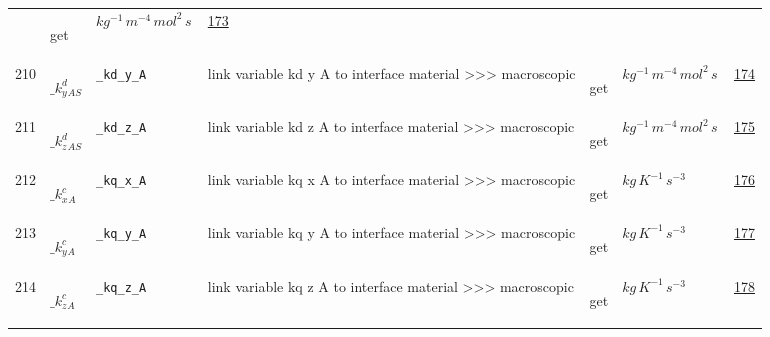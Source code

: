 \begin{longtable}{|p{1cm}|p{2.5cm}|p{4.5cm}|p{8cm}|p{3.0cm}|p{3cm}|p{1cm}|}
             & \begin{lay}get \end{lay}
             & $ kg^{-1} \,m^{-4} \,mol^{2} \,s \, $
             &                 \hyperlink{"e:173"}{ 173 }
                 \\
            210
             & \hypertarget{"v:210"}{ $ {{\_k^d_y}}{_{{A S}}} $}
             & \verb|_kd_y_A|
             & link variable kd y A to interface material >>> macroscopic
             & \begin{lay}get \end{lay}
             & $ kg^{-1} \,m^{-4} \,mol^{2} \,s \, $
             &                 \hyperlink{"e:174"}{ 174 }
                 \\
            211
             & \hypertarget{"v:211"}{ $ {{\_k^d_z}}{_{{A S}}} $}
             & \verb|_kd_z_A|
             & link variable kd z A to interface material >>> macroscopic
             & \begin{lay}get \end{lay}
             & $ kg^{-1} \,m^{-4} \,mol^{2} \,s \, $
             &                 \hyperlink{"e:175"}{ 175 }
                 \\
            212
             & \hypertarget{"v:212"}{ $ {{\_k^c_x}}{_{A}} $}
             & \verb|_kq_x_A|
             & link variable kq x A to interface material >>> macroscopic
             & \begin{lay}get \end{lay}
             & $ kg \,K^{-1} \,s^{-3} \, $
             &                 \hyperlink{"e:176"}{ 176 }
                 \\
            213
             & \hypertarget{"v:213"}{ $ {{\_k^c_y}}{_{A}} $}
             & \verb|_kq_y_A|
             & link variable kq y A to interface material >>> macroscopic
             & \begin{lay}get \end{lay}
             & $ kg \,K^{-1} \,s^{-3} \, $
             &                 \hyperlink{"e:177"}{ 177 }
                 \\
            214
             & \hypertarget{"v:214"}{ $ {{\_k^c_z}}{_{A}} $}
             & \verb|_kq_z_A|
             & link variable kq z A to interface material >>> macroscopic
             & \begin{lay}get \end{lay}
             & $ kg \,K^{-1} \,s^{-3} \, $
             &                 \hyperlink{"e:178"}{ 178 }
                 \\

\end{longtable}
